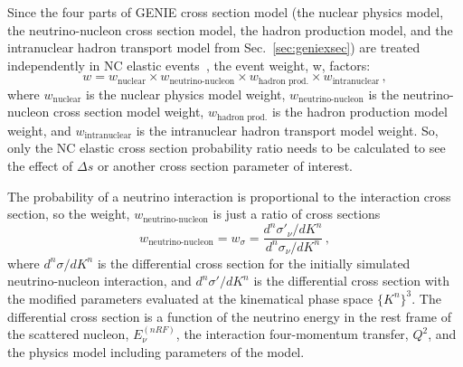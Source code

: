     Since the four parts of GENIE cross section model (the nuclear physics
    model, the neutrino-nucleon cross section model, the hadron production
    model, and the intranuclear hadron transport model from
    Sec.~\ref{sec:geniexsec}) are treated independently in NC elastic
    events~\cite{GENIE}, the event weight, w, factors:
    \begin{equation}\label{eq:weights}
      w = w_{\textrm{nuclear}}\times w_{\textrm{neutrino-nucleon}}\times 
          w_{\textrm{hadron prod.}}\times w_{\textrm{intranuclear}} \,,
    \end{equation}
    where $w_{\textrm{nuclear}}$ is the nuclear physics model weight,
    $w_{\textrm{neutrino-nucleon}}$ is the neutrino-nucleon cross section model
    weight, $w_{\textrm{hadron prod.}}$ is the hadron production model weight,
    and $w_{\textrm{intranuclear}}$ is the intranuclear hadron transport model
    weight. So, only the NC elastic cross section probability ratio needs to be
    calculated to see the effect of $\Delta s$ or another cross section
    parameter of interest.

    The probability of a neutrino interaction is proportional to the
    interaction cross section, so the weight, $w_{\textrm{neutrino-nucleon}}$
    is just a ratio of cross sections
    \begin{equation}
      w_{\textrm{neutrino-nucleon}} = w_{\sigma} 
        = \frac{d^n\sigma'_{\nu}/dK^n}{d^n\sigma_{\nu}/dK^n} \,,
    \end{equation}
    where $d^n\sigma/dK^n$ is the differential cross section for the initially
    simulated neutrino-nucleon interaction, and $d^n\sigma'/dK^n$ is the
    differential cross section with the modified parameters evaluated at the
    kinematical phase space $\{K^n\}^3$. The differential cross section is a
    function of the neutrino energy in the rest frame of the scattered nucleon,
    $E_{\nu}^{(nRF)}$, the interaction four-momentum transfer, $Q^2$, and the
    physics model including parameters of the model.

